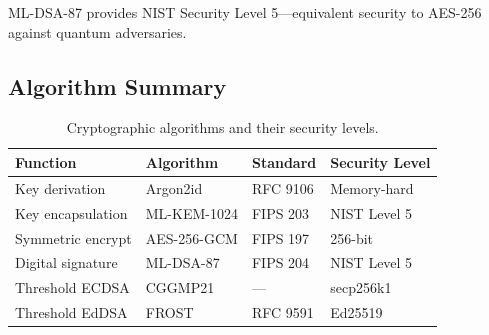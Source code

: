 ML-DSA-87 provides NIST Security Level 5---equivalent security to
AES-256 against quantum adversaries.

\subsection{Algorithm Summary}

\begin{table}[h]
\centering
\small
\begin{tabular}{@{}llll@{}}
\toprule
\textbf{Function} & \textbf{Algorithm} & \textbf{Standard} & \textbf{Security Level} \\
\midrule
Key derivation    & Argon2id       & RFC 9106       & Memory-hard \\
Key encapsulation & ML-KEM-1024    & FIPS 203       & NIST Level 5 \\
Symmetric encrypt & AES-256-GCM    & FIPS 197       & 256-bit \\
Digital signature  & ML-DSA-87      & FIPS 204       & NIST Level 5 \\
Threshold ECDSA   & CGGMP21        & ---            & secp256k1 \\
Threshold EdDSA   & FROST          & RFC 9591       & Ed25519 \\
\bottomrule
\end{tabular}
\caption{Cryptographic algorithms and their security levels.}
\label{tab:algorithms}
\end{table}

